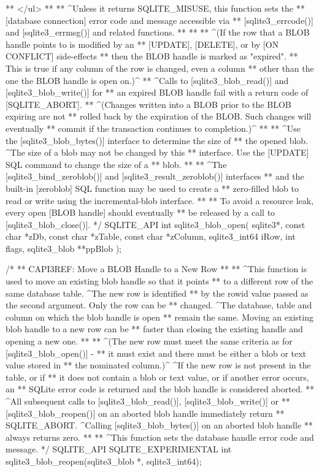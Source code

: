 \begin{Codex}[label=sqlite3.h,numbers=left]
{** </ul>
**
** ^Unless it returns SQLITE_MISUSE, this function sets the 
** [database connection] error code and message accessible via 
** [sqlite3_errcode()] and [sqlite3_errmsg()] and related functions. 
**
**
** ^(If the row that a BLOB handle points to is modified by an
** [UPDATE], [DELETE], or by [ON CONFLICT] side-effects
** then the BLOB handle is marked as "expired".
** This is true if any column of the row is changed, even a column
** other than the one the BLOB handle is open on.)^
** ^Calls to [sqlite3_blob_read()] and [sqlite3_blob_write()] for
** an expired BLOB handle fail with a return code of [SQLITE_ABORT].
** ^(Changes written into a BLOB prior to the BLOB expiring are not
** rolled back by the expiration of the BLOB.  Such changes will eventually
** commit if the transaction continues to completion.)^
**
** ^Use the [sqlite3_blob_bytes()] interface to determine the size of
** the opened blob.  ^The size of a blob may not be changed by this
** interface.  Use the [UPDATE] SQL command to change the size of a
** blob.
**
** ^The [sqlite3_bind_zeroblob()] and [sqlite3_result_zeroblob()] interfaces
** and the built-in [zeroblob] SQL function may be used to create a 
** zero-filled blob to read or write using the incremental-blob interface.
**
** To avoid a resource leak, every open [BLOB handle] should eventually
** be released by a call to [sqlite3_blob_close()].
*/
SQLITE_API int sqlite3_blob_open(
  sqlite3*,
  const char *zDb,
  const char *zTable,
  const char *zColumn,
  sqlite3_int64 iRow,
  int flags,
  sqlite3_blob **ppBlob
);

/*
** CAPI3REF: Move a BLOB Handle to a New Row
**
** ^This function is used to move an existing blob handle so that it points
** to a different row of the same database table. ^The new row is identified
** by the rowid value passed as the second argument. Only the row can be
** changed. ^The database, table and column on which the blob handle is open
** remain the same. Moving an existing blob handle to a new row can be
** faster than closing the existing handle and opening a new one.
**
** ^(The new row must meet the same criteria as for [sqlite3_blob_open()] -
** it must exist and there must be either a blob or text value stored in
** the nominated column.)^ ^If the new row is not present in the table, or if
** it does not contain a blob or text value, or if another error occurs, an
** SQLite error code is returned and the blob handle is considered aborted.
** ^All subsequent calls to [sqlite3_blob_read()], [sqlite3_blob_write()] or
** [sqlite3_blob_reopen()] on an aborted blob handle immediately return
** SQLITE_ABORT. ^Calling [sqlite3_blob_bytes()] on an aborted blob handle
** always returns zero.
**
** ^This function sets the database handle error code and message.
*/
SQLITE_API SQLITE_EXPERIMENTAL int sqlite3_blob_reopen(sqlite3_blob *, sqlite3_int64);

}
\end{Codex}
